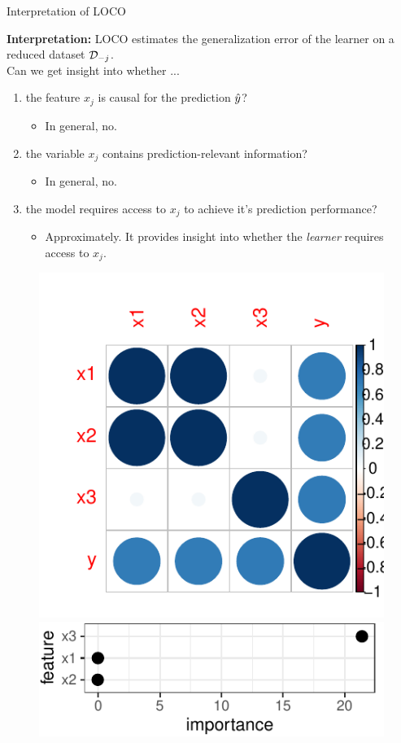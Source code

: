\documentclass[11pt,compress,t,notes=noshow, xcolor=table]{beamer}
\begin{document}
\begin{vbframe}{Interpretation of LOCO}

\textbf{Interpretation:} LOCO estimates the generalization error of the learner on a reduced dataset $\D_{-j}$.\\
\lz
Can we get insight into whether ...
\begin{enumerate}
    \item the feature $x_j$ is causal for the prediction $\yh$?
    \begin{itemize}
      \item In general, no.
    \end{itemize}
    \item the variable $x_j$ contains prediction-relevant information?
    \begin{itemize}
      \item In general, no.
    \end{itemize}
    \item the model requires access to $x_j$ to achieve it's prediction performance?
    \begin{itemize}
      \item Approximately. It provides insight into whether the \textit{learner} requires access to $x_j$.
    \end{itemize}
\end{enumerate}

\framebreak

\begin{figure}
\centering
\hfill
	\includegraphics[width=0.25\linewidth]{figure_man/simulation_corr.pdf} 
\hfill
  \includegraphics[width=0.5\linewidth]{figure_man/simulation_loco}
  \hfill
\end{figure}


\end{vbframe}
\end{document}
